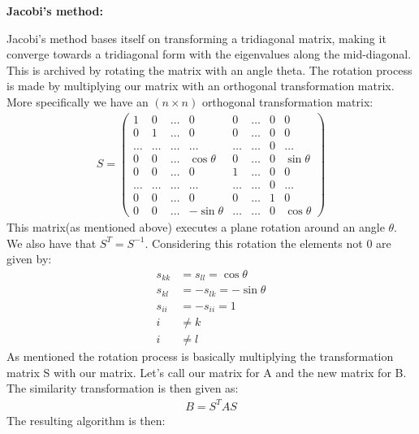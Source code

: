 \documentclass[11pt, a4 paper]{report}
\newenvironment{tabbed}{\begin{addmargin}{0.1cm}}{\end{addmargin}}
\newcommand{\sectionundertitle}[1]{\hspace{-0.5cm} \textbf{{#1}}}
\begin{document}
    \sectionundertitle{Jacobi's method:}
    \begin{tabbed}
        Jacobi's method bases itself on transforming a tridiagonal matrix, making it converge towards a tridiagonal form with the eigenvalues along the mid-diagonal. This is archived by rotating the matrix with an angle theta. The rotation process is made by multiplying our matrix with an orthogonal transformation matrix. More specifically we have an $(n\times n)$ orthogonal transformation matrix:
        \begin{align*}
            S =
            \begin{pmatrix}
                1 & 0 & \dots & 0 & 0 & \dots & 0 & 0\\
                0 & 1 & \dots & 0 & 0 &\dots & 0 & 0\\
                \dots & \dots & \dots & \dots & \dots & \dots & 0 & \dots\\
                0 & 0 & \dots & \cos{\theta} & 0 & \dots & 0 & \sin{\theta}\\
                0 & 0 & \dots & 0 & 1 & \dots & 0 & 0\\
                \dots & \dots & \dots & \dots & \dots & \dots & 0 & \dots\\
                0 & 0 & \dots & 0 & 0 & \dots & 1 & 0\\
                0 & 0 & \dots & -\sin{\theta} & \dots & \dots & 0 & \cos{\theta}
            \end{pmatrix}
        \end{align*}
        This matrix(as mentioned above) executes a plane rotation around an angle $\theta$. We also have that $S^T=S^{-1}$. Considering this rotation the elements not 0 are given by:
        \begin{align*}
            s_{kk} &= s_{ll} = \cos{\theta}\\
            s_{kl} &= -s_{lk} = -\sin{\theta}\\
            s_{ii} &= -s_{ii} = 1\\
            i &\neq k\\
            i &\neq l
        \end{align*}
        As mentioned the rotation process is basically multiplying the transformation matrix S with our matrix. Let's call our matrix for A and the new matrix for B. The similarity transformation is then given as:
        \begin{align*}
            B = S^TAS
        \end{align*}
        The resulting algorithm is then:

\end{tabbed}
\end{document}
